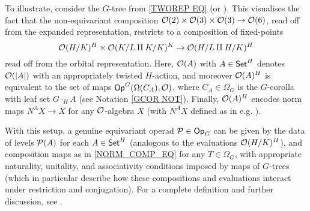 \documentclass[a4paper,10pt
,draft
]{article}%
\begin{document}
\begin{example}%
      To illustrate, consider the $G$-tree from \eqref{TWOREP EQ} (or \cite[Example 4.9]{Per17}).
      This visualises the fact that the non-equivariant composition
      \mbox{$\O(2) \times \O(3) \times \O(3) \to \O(6)$},
      read off from the expanded representation,
      restricts to a composition of fixed-points 
      \begin{equation}
            \label{NORM_COMP_EQ}
            \O(H/K)^H \times \O(K/L \amalg K/K)^K \to \O(H/L \amalg H/K)^H
      \end{equation}
      read off from the orbital representation.
      Here, $\O(A)$ with $A \in \Set^H$ denotes $\O(|A|)$ with an appropriately twisted $H$-action,
      and moreover $\O(A)^H$ is equivalent to the set of maps $\Op^G(\Omega(C_A), \O)$,
      where $C_A \in \Omega_G$ is the $G$-corolla with leaf set $G \cdot_H A$ (see Notation \ref{GCOR NOT}).
      Finally, $\O(A)^H$ encodes norm maps $N^A X \to X$ for any $\O$-algebra $X$
      (with $N^A X$ defined as in e.g. \cite{BH15}).
\end{example}

With this setup, a genuine equivariant operad $\P \in \Op_G$ can be given by the data of
levels $\P(A)$ for each $A \in \Set^H$ (analogous to the evaluations $\O(H/K)^H$),
and composition maps as in \eqref{NORM_COMP_EQ} for any $T \in \Omega_G$,
with appropriate naturality, unitality, and associativity conditions imposed by maps of $G$-trees
(which in particular describe how these compositions and evaluations interact under restriction and conjugation).
For a complete definition and further discussion, see \cite[\S4]{BP17}.

\end{document}
